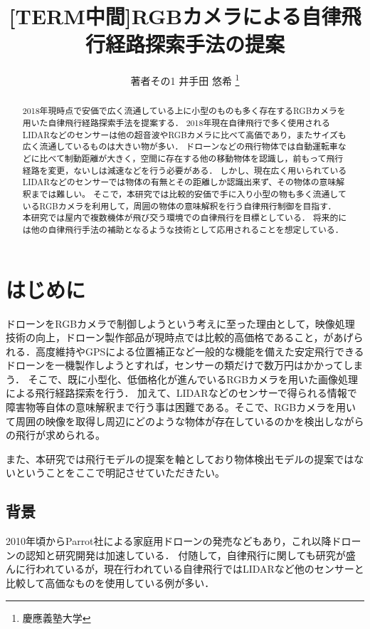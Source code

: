 \documentclass[uplatex,a4j,10pt]{jsarticle}
\begin{document}

\title{[TERM中間]RGBカメラによる自律飛行経路探索手法の提案}

\author{
    著者その1 {井手田 悠希} \thanks{慶應義塾大学}
}

\begin{abstract}
2018年現時点で安価で広く流通している上に小型のものも多く存在するRGBカメラを用いた自律飛行経路探索手法を提案する．
2018年現在自律飛行で多く使用されるLIDARなどのセンサーは他の超音波やRGBカメラに比べて高価であり，またサイズも広く流通しているものは大きい物が多い．
ドローンなどの飛行物体では自動運転車などに比べて制動距離が大きく，空間に存在する他の移動物体を認識し，前もって飛行経路を変更，ないしは減速などを行う必要がある．
しかし、現在広く用いられているLIDARなどのセンサーでは物体の有無とその距離しか認識出来ず、その物体の意味解釈までは難しい。
そこで，本研究では比較的安価で手に入り小型の物も多く流通しているRGBカメラを利用して，周囲の物体の意味解釈を行う自律飛行制御を目指す．
本研究では屋内で複数機体が飛び交う環境での自律飛行を目標としている．
将来的には他の自律飛行手法の補助となるような技術として応用されることを想定している．

\end{abstract}

\maketitle
\thispagestyle{empty}

\section{はじめに}
ドローンをRGBカメラで制御しようという考えに至った理由として，映像処理技術の向上，ドローン製作部品が現時点では比較的高価格であること，があげられる．高度維持やGPSによる位置補正など一般的な機能を備えた安定飛行できるドローンを一機製作しようとすれば，センサーの類だけで数万円はかかってしまう．
そこで、既に小型化、低価格化が進んでいるRGBカメラを用いた画像処理による飛行経路探索を行う．
加えて、LIDARなどのセンサーで得られる情報で障害物等自体の意味解釈まで行う事は困難である。そこで、RGBカメラを用いて周囲の映像を取得し周辺にどのような物体が存在しているのかを検出しながらの飛行が求められる。

また、本研究では飛行モデルの提案を軸としており物体検出モデルの提案ではないということをここで明記させていただきたい。


\subsection{背景}
2010年頃からParrot社による家庭用ドローンの発売などもあり，これ以降ドローンの認知と研究開発は加速している．
付随して，自律飛行に関しても研究が盛んに行われているが，現在行われている自律飛行ではLIDARなど他のセンサーと比較して高価なものを使用している例が多い．
\end{document}
